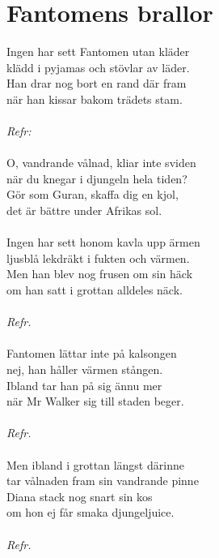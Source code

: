 \section{Fantomens brallor}
Ingen har sett Fantomen utan kläder\\
klädd i pyjamas och stövlar av läder.\\
Han drar nog bort en rand där fram\\
när han kissar bakom trädets stam.\\
\\
\textit{Refr:}\\
\\
O, vandrande vålnad, kliar inte sviden\\
när du knegar i djungeln hela tiden?\\
Gör som Guran, skaffa dig en kjol,\\
det är bättre under Afrikas sol.\\
\\
Ingen har sett honom kavla upp ärmen\\
ljusblå lekdräkt i fukten och värmen.\\
Men han blev nog frusen om sin häck\\
om han satt i grottan alldeles näck.\\
\\
\textit{Refr.}\\
\\
Fantomen lättar inte på kalsongen\\
nej, han håller värmen stången.\\
Ibland tar han på sig ännu mer\\
när Mr Walker sig till staden beger.\\
\\
\textit{Refr.}\\
\\
Men ibland i grottan längst därinne\\
tar vålnaden fram sin vandrande pinne\\
Diana stack nog snart sin kos\\
om hon ej får smaka djungeljuice.\\
\\
\textit{Refr.}


